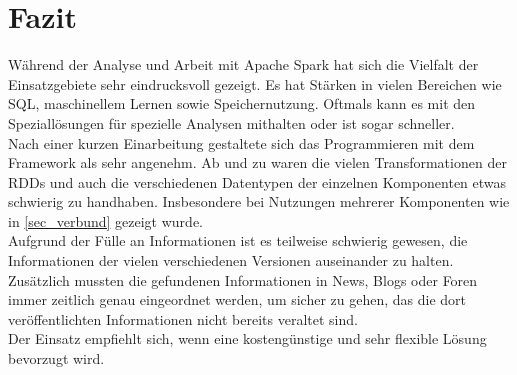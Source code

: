 \newpage
\chapter{Fazit} 

Während der Analyse und Arbeit mit Apache Spark hat sich die Vielfalt der Einsatzgebiete sehr eindrucksvoll gezeigt. Es hat Stärken in vielen Bereichen wie SQL, maschinellem Lernen sowie Speichernutzung. Oftmals kann es mit den Speziallösungen für spezielle Analysen mithalten oder ist sogar schneller.\\

\noindent
Nach einer kurzen Einarbeitung gestaltete sich das Programmieren mit dem Framework als sehr angenehm. Ab und zu waren die vielen Transformationen der RDDs und auch die verschiedenen Datentypen der einzelnen Komponenten etwas schwierig zu handhaben. Insbesondere bei Nutzungen mehrerer Komponenten wie in \autoref{sec_verbund} gezeigt wurde.\\

\noindent
Aufgrund der Fülle an Informationen ist es teilweise schwierig gewesen, die Informationen der vielen verschiedenen Versionen auseinander zu halten. Zusätzlich mussten die gefundenen Informationen in News, Blogs oder Foren immer zeitlich genau eingeordnet werden, um sicher zu gehen, das die dort veröffentlichten Informationen nicht bereits veraltet sind.\\

\noindent
Der Einsatz empfiehlt sich, wenn eine kostengünstige und sehr flexible Lösung bevorzugt wird.